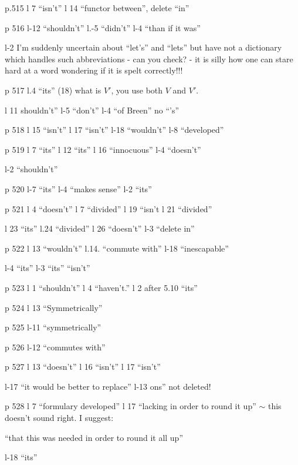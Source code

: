 
p.515 l 7 ``isn't'' \quad l 14 ``functor between'', delete ``in''

p 516 l-12 ``shouldn't'' \quad l.-5 ``didn't'' \quad l-4 ``than if it was''

l-2 I'm suddenly uncertain about ``let's'' and ``lets'' but have not a dictionary which handles such abbreviations - can you check? - it is silly how one can stare hard at a  word wondering if it is spelt correctly!!!

p 517 l.4 ``its'' \quad (18) what is $V'$, you use both $V$ and $V'$.

l 11 shouldn't'' \quad l-5 ``don't'' \quad l-4 ``of Breen'' no ``'s''

p 518 l 15 ``isn't'' \quad l 17 ``isn't'' \quad l-18 ``wouldn't'' \quad l-8 ``developed''

p 519 l 7 ``its'' \quad l 12 ``its'' \quad l 16 ``innocuous'' \quad l-4 ``doesn't''

l-2 ``shouldn't''

p 520 l-7 ``its'' \quad l-4 ``makes sense'' \quad l-2 ``its''

p 521 l 4 ``doesn't'' \quad l 7 ``divided'' \quad l 19 ``isn't \quad l 21 ``divided''

l 23 ``its'' \quad l.24 ``divided'' \quad l 26 ``doesn't'' \quad l-3 ``delete in''

p 522 l 13 ``wouldn't'' \quad l.14. ``commute with'' \quad l-18 ``inescapable''

l-4 ``its'' \quad l-3 ``its'' ``isn't''

p 523 l 1 ``shouldn't'' \quad l 4 ``haven't.'' \quad l 2 after 5.10 ``its''

p 524 l 13 ``Symmetrically''

p 525 l-11 ``symmetrically'' 

p 526 l-12 ``commutes with''

p 527 l 13 ``doesn't'' \quad l 16 ``isn't'' \quad l 17 ``isn't'' \quad {}

l-17 ``it would be better to replace'' \quad l-13 ons'' not deleted!

p 528 l 7 ``formulary developed'' \quad l 17 ``lacking in order to round it up'' \(\sim\) this doesn't sound right. I suggest:

``that this was needed in order to round it all up''

l-18 ``its''

